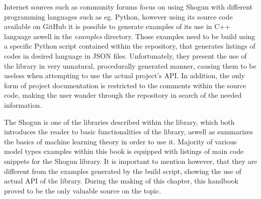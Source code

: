 Internet sources such as community forums focus on using Shogun with different programming languages such as eg. Python, however using its source code available on GitHub \cite{shogun:github} it is possible to generate examples of its use in C++ language aswell in the \textit{examples} directory. Those examples need to be build using a specific Python script contained within the repository, that generates listings of codes in desired language in JSON files. Unfortunately, they present the use of the library in very unnatural, procedurally generated manner, causing them to be useless when attempting to use the actual project's API. In addition, the only form of project documentation is restricted to the comments within the source code, making the user wander through the repository in search of the needed information.

The Shogun is one of the libraries described within the \cite{handsOnMachineLearning} library, which both introduces the reader to basic functionalities of the library, aswell as summarizes the basics of machine learning theory in order to use it. Majority of various model types examples within this book is equipped with listings of main code snippets for the Shogun library. It is important to mention however, that they are different from the examples generated by the build script, showing the use of actual API of the library. During the making of this chapter, this handbook proved to be the only valuable source on the topic.